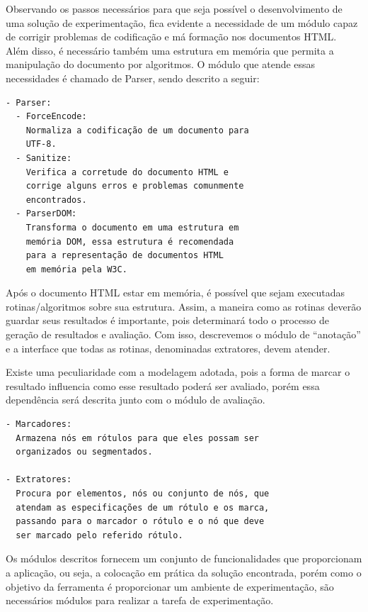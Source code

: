 \documentclass[12pt, a4paper]{article}
\begin{document}

Observando os passos necessários para que seja possível o 
desenvolvimento de uma solução de experimentação, fica evidente a
necessidade de um módulo capaz de corrigir problemas de
codificação e má formação nos documentos HTML. Além
disso, é necessário também uma estrutura em memória que permita a
manipulação do documento por algoritmos.
O módulo que atende essas necessidades é chamado de Parser, sendo 
descrito a seguir:

\begin{verbatim}
- Parser: 
  - ForceEncode:
    Normaliza a codificação de um documento para
    UTF-8.
  - Sanitize:
    Verifica a corretude do documento HTML e
    corrige alguns erros e problemas comunmente
    encontrados.
  - ParserDOM:
    Transforma o documento em uma estrutura em
    memória DOM, essa estrutura é recomendada
    para a representação de documentos HTML
    em memória pela W3C.
\end{verbatim}

Após o documento HTML estar em memória, é possível que sejam executadas
rotinas/algoritmos sobre sua estrutura. Assim,
a maneira como as rotinas deverão guardar seus resultados
é importante, pois determinará todo o processo de geração de resultados
e avaliação. Com isso, descrevemos o módulo de ``anotação'' e a interface
que todas as rotinas, denominadas extratores, devem atender.

Existe uma peculiaridade com a modelagem adotada, pois a forma de marcar
o resultado influencia como esse resultado poderá ser avaliado, porém
essa dependência será descrita junto com o módulo de avaliação.

\begin{verbatim}
- Marcadores:
  Armazena nós em rótulos para que eles possam ser
  organizados ou segmentados.

- Extratores:
  Procura por elementos, nós ou conjunto de nós, que
  atendam as especificações de um rótulo e os marca,
  passando para o marcador o rótulo e o nó que deve
  ser marcado pelo referido rótulo.
\end{verbatim}

Os módulos descritos fornecem um conjunto de
funcionalidades que proporcionam a aplicação, ou seja, a colocação em
prática da solução encontrada,
porém como o objetivo da ferramenta é proporcionar um ambiente
de experimentação, são necessários módulos para realizar a tarefa de experimentação.
\end{document}
